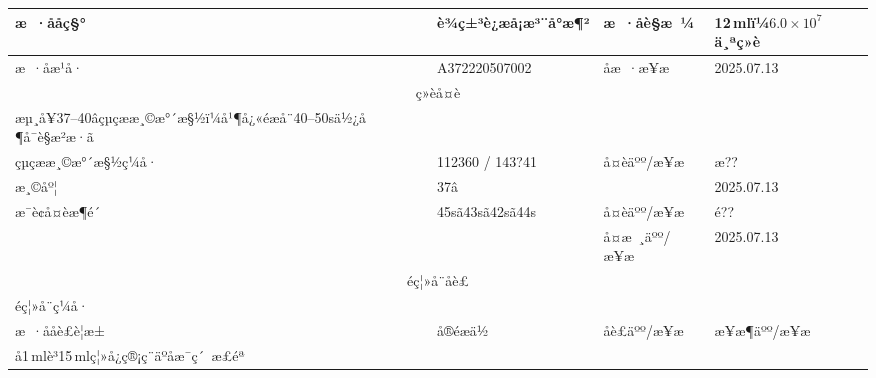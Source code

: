 \documentclass[UTF8,10pt,a4paper,fontset=fandol]{ctexart}
\newcommand{\fieldvalue}[1]{#1}
\newcommand{\handwritten}[1]{#1}
\begin{document}
\begin{tabularx}{\textwidth}{|p{2.5cm}|X|p{2.5cm}|X|}
\hline
æ ·ååç§° &
\fieldvalue{è¾ç±³è¿æå¡æ³¨å°æ¶²} &
æ ·åè§æ ¼ &
\fieldvalue{12\,mlï¼$6.0\times10^{7}$ä¸ªç»è}
\\ \hline
æ ·åæ¹å· &
\fieldvalue{\handwritten{A372220507002}} &
åæ ·æ¥æ &
\fieldvalue{\handwritten{2025.07.13}}
\\ \hline
\multicolumn{4}{|c|}{ç»èå¤è}\\ \hline
æµ¸å¥37--40âçµç­ææ¸©æ°´æ§½ï¼å¹¶å¿«éæå¨40--50sä½¿å¶å¯è§æ²æ·ã &
\multicolumn{3}{l|}{}\\ \hline
çµç­ææ¸©æ°´æ§½ç¼å· &
\fieldvalue{\handwritten{112360 / 143?41}} &
å¤èäºº/æ¥æ &
\fieldvalue{\handwritten{æ??}}
\\ \cline{1-2}\cline{4-4}
æ¸©åº¦ &
\fieldvalue{\handwritten{37â}} &
&
\fieldvalue{\handwritten{2025.07.13}}
\\ \hline
æ¯è¢å¤èæ¶é´ &
\fieldvalue{\handwritten{45sã43sã42sã44s}} &
å¤èäºº/æ¥æ &
\fieldvalue{\handwritten{é??}}
\\ \cline{1-2}\cline{4-4}
&
&
å¤æ ¸äºº/æ¥æ &
\fieldvalue{\handwritten{2025.07.13}}
\\ \hline
\multicolumn{4}{|c|}{éç¦»å¨åè£}\\ \hline
éç¦»å¨ç¼å· & & \multicolumn{2}{l|}{}\\ \hline
æ ·ååè£è¦æ± & å®éæä½ & åè£äºº/æ¥æ & æ¥æ¶äºº/æ¥æ\\ \hline
å1\,mlè³15\,mlç¦»å¿ç®¡ç¨äºåæ¯ç´ æ£éª &

\end{tabularx}
\end{document}
